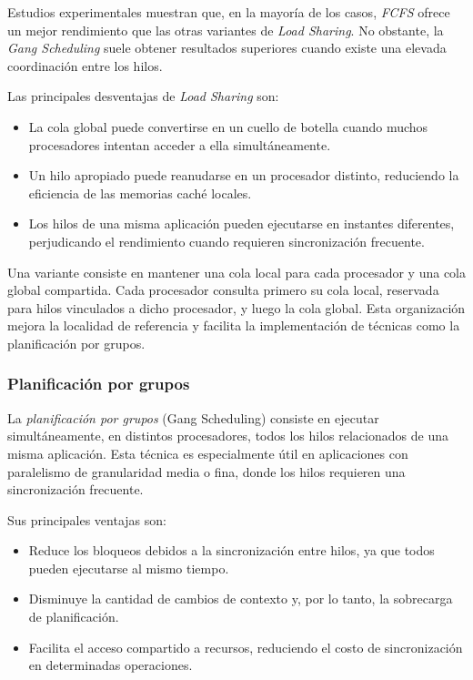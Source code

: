 Estudios experimentales muestran que, en la mayoría de los casos, \textit{FCFS} ofrece un mejor rendimiento que las otras variantes de \textit{Load Sharing}. No obstante, la \textit{Gang Scheduling} suele obtener resultados superiores cuando existe una elevada coordinación entre los hilos.

Las principales desventajas de \textit{Load Sharing} son:
\begin{itemize}
  \item La cola global puede convertirse en un cuello de botella cuando muchos procesadores intentan acceder a ella simultáneamente.
  \item Un hilo apropiado puede reanudarse en un procesador distinto, reduciendo la eficiencia de las memorias caché locales.
  \item Los hilos de una misma aplicación pueden ejecutarse en instantes diferentes, perjudicando el rendimiento cuando requieren sincronización frecuente.
\end{itemize}

Una variante consiste en mantener una cola local para cada procesador y una cola global compartida. Cada procesador consulta primero su cola local, reservada para hilos vinculados a dicho procesador, y luego la cola global. Esta organización mejora la localidad de referencia y facilita la implementación de técnicas como la planificación por grupos.

\subsubsection{Planificación por grupos}

La \textit{planificación por grupos} (Gang Scheduling) consiste en ejecutar simultáneamente, en distintos procesadores, todos los hilos relacionados de una misma aplicación. Esta técnica es especialmente útil en aplicaciones con paralelismo de granularidad media o fina, donde los hilos requieren una sincronización frecuente.

Sus principales ventajas son:
\begin{itemize}
  \item Reduce los bloqueos debidos a la sincronización entre hilos, ya que todos pueden ejecutarse al mismo tiempo.
  \item Disminuye la cantidad de cambios de contexto y, por lo tanto, la sobrecarga de planificación.
  \item Facilita el acceso compartido a recursos, reduciendo el costo de sincronización en determinadas operaciones.
\end{itemize}

